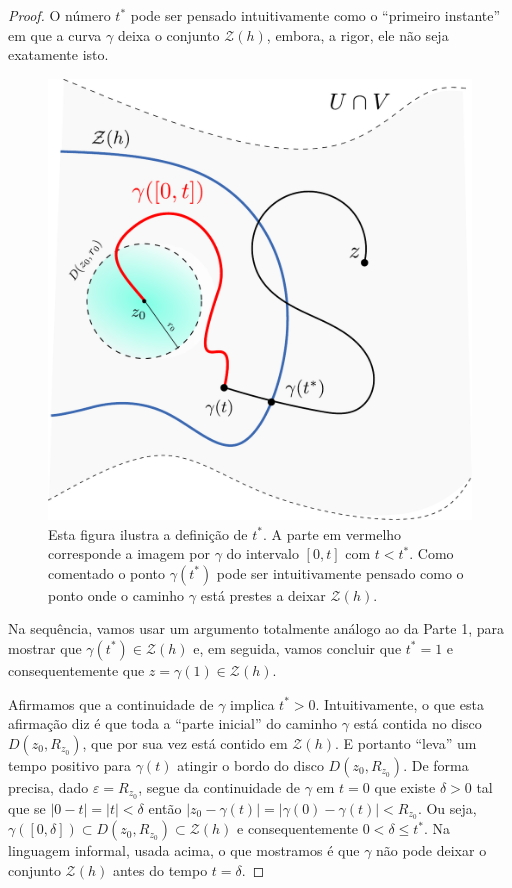 \begin{proof}
O número $t^{*}$ pode ser pensado intuitivamente como 
o ``primeiro instante'' em que a curva $\gamma$ deixa 
o conjunto $\mathcal{Z}(h)$, embora, a rigor,
ele não seja exatamente isto.

\begin{figure}[H]
\centering
\includegraphics[width=0.55\linewidth]{Figuras/zeros-isolados5}
\caption{Esta figura ilustra a definição de $t^{*}$. A parte em vermelho corresponde a imagem por $\gamma$ do intervalo $[0,t]$ com $t<t^{*}$. Como comentado o ponto $\gamma(t^{*})$ pode ser intuitivamente pensado como o ponto onde o caminho $\gamma$ está prestes a deixar $\mathcal{Z}(h)$.}
\label{fig:zeros-isolados5}
\end{figure}





\medskip 

Na sequência, vamos usar um argumento totalmente análogo ao da Parte 1, 
para mostrar que $\gamma(t^{*})\in \mathcal{Z}(h)$ e, em
seguida, vamos concluir que $t^{*}=1$ e consequentemente que 
$z=\gamma(1)\in \mathcal{Z}(h)$.

\medskip 

Afirmamos que a continuidade de $\gamma$ implica $t^{*}>0$. 
Intuitivamente, o que esta afirmação diz é que toda a ``parte inicial'' 
do caminho $\gamma$ está contida no disco $D(z_0,R_{z_0})$, que por sua vez
está contido em $\mathcal{Z}(h)$. E portanto ``leva'' um tempo positivo para $\gamma(t)$ atingir o bordo do disco $D(z_0,R_{z_0})$. 
De forma precisa, dado $\varepsilon= R_{z_0}$,
segue da continuidade de $\gamma$ em $t=0$ que 
existe $\delta>0$ tal que se $|0-t|=|t|<\delta$ então 
$|z_0-\gamma(t)|=|\gamma(0)-\gamma(t)|<R_{z_0}$. Ou seja, 
$\gamma([0,\delta])\subset D(z_0,R_{z_0})\subset\mathcal{Z}(h)$ e 
consequentemente $0<\delta\leq t^{*}$. Na linguagem informal, usada
acima, o que mostramos é que $\gamma$ não pode deixar o conjunto $\mathcal{Z}(h)$
antes do tempo $t=\delta$. 






\end{proof}
